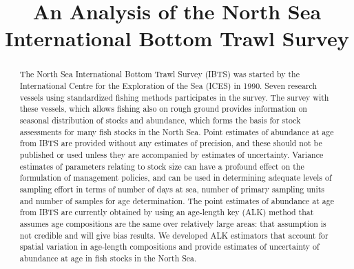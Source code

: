 \documentclass[a4paper 14pt]{article}
\title{\bf 
}
\author{}
\date{}
\numberwithin{equation}{section}
\begin{document}
\title{An Analysis of the North Sea International Bottom Trawl Survey}
\maketitle


\begin{abstract}


\fontsize{11.3}{13.5}\selectfont
The North Sea International Bottom Trawl Survey (IBTS) was started by the International Centre for the  Exploration of the Sea (ICES) in 1990. Seven research vessels using standardized fishing methods participates in the survey. The survey with these vessels, which allows fishing also on rough ground provides information on seasonal distribution of stocks and abundance,  which forms the basis for stock assessments for many fish stocks in the North Sea. Point estimates of abundance at age from IBTS are provided without any estimates of precision,  and these should not be published or used unless they are accompanied by estimates of uncertainty. Variance estimates of parameters relating to stock size can have a profound effect on the formulation of management policies, and can be used in determining adequate levels of sampling effort in terms of number of days at sea, number of primary sampling units and number of samples for age determination. The point estimates of abundance at age from IBTS are currently obtained by using an age-length key (ALK) method that assumes age compositions are the same over relatively large areas: that assumption is not credible and will give bias results. We developed ALK estimators that account for spatial variation in age-length compositions and provide estimates of uncertainty of abundance at age in fish stocks in the North Sea.  \\



\end{abstract}
\end{document}
